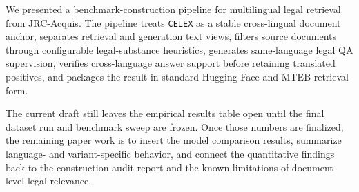 We presented a benchmark-construction pipeline for multilingual legal retrieval from JRC-Acquis. The pipeline treats \texttt{CELEX} as a stable cross-lingual document anchor, separates retrieval and generation text views, filters source documents through configurable legal-substance heuristics, generates same-language legal QA supervision, verifies cross-language answer support before retaining translated positives, and packages the result in standard Hugging Face and MTEB retrieval form.

The current draft still leaves the empirical results table open until the final dataset run and benchmark sweep are frozen. Once those numbers are finalized, the remaining paper work is to insert the model comparison results, summarize language- and variant-specific behavior, and connect the quantitative findings back to the construction audit report and the known limitations of document-level legal relevance.
